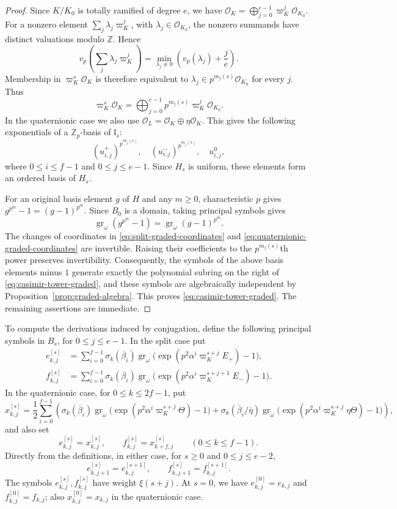 \documentclass[11pt]{article}
\numberwithin{equation}{section}
\theoremstyle{definition}
\theoremstyle{remark}
\newcommand{\Z}{\mathbb Z}
\newcommand{\cO}{\mathcal O}
\DeclareMathOperator{\gr}{gr}
\begin{document}
\begin{proof}
Since $K/K_0$ is totally ramified of degree $e$, we have
$\cO_K=\bigoplus_{j=0}^{e-1}\varpi_K^j\cO_{K_0}$.
For a nonzero element $\sum_j\lambda_j\varpi_K^j$, with
$\lambda_j\in\cO_{K_0}$, the nonzero summands have distinct
valuations modulo $\Z$. Hence
\[
 v_p\!\left(\sum_j\lambda_j\varpi_K^j\right)
   =\min_{\lambda_j\ne0}\left(v_p(\lambda_j)+\frac je\right).
\]
Membership in $\varpi_K^s\cO_K$ is therefore equivalent to
$\lambda_j\in p^{m_j(s)}\cO_{K_0}$ for every $j$. Thus
\[
 \varpi_K^s\cO_K
   =\bigoplus_{j=0}^{e-1}p^{m_j(s)}\varpi_K^j\cO_{K_0}.
\]
In the quaternionic case we also use
$\cO_L=\cO_K\oplus\eta\cO_K$. This gives the following exponentials
of a $\Z_p$-basis of $\mathfrak l_s$:
\[
 (u^+_{i,j})^{p^{m_j(s)}},\quad
 (u^-_{i,j})^{p^{m_j(s)}},\quad u^0_{i,j},
\]
where $0\leq i\leq f-1$ and $0\leq j\leq e-1$.
Since $H_s$ is uniform, these elements form an ordered basis of $H_s$.

For an original basis element $g$ of $H$ and any $m\geq0$,
characteristic $p$ gives $g^{p^m}-1=(g-1)^{p^m}$. Since $B_0$ is
a domain, taking principal symbols gives
\[
 \gr_\omega(g^{p^m}-1)=\gr_\omega(g-1)^{p^m}.
\]
The changes of coordinates in
\eqref{eq:split-graded-coordinates} and
\eqref{eq:quaternionic-graded-coordinates} are invertible.
Raising their coefficients to the $p^{m_j(s)}$th power preserves
invertibility.
Consequently, the symbols of the above basis elements minus $1$
generate exactly the polynomial subring on the right of
\eqref{eq:casimir-tower-graded}, and these symbols are algebraically
independent by Proposition~\ref{prop:graded-algebra}.
This proves \eqref{eq:casimir-tower-graded}.
The remaining assertions are immediate.
\end{proof}

To compute the derivations induced by conjugation, define the
following principal symbols in $B_s$, for $0\leq j\leq e-1$.
In the split case put
\[
 \begin{aligned}
 e_{k,j}^{[s]}&=\sum_{i=0}^{f-1}\sigma_k(\overline\beta_i)
    \gr_\omega\bigl(\exp(p^2\alpha^i\varpi_K^{s+j}E_+)-1\bigr),\\
 f_{k,j}^{[s]}&=\sum_{i=0}^{f-1}\sigma_k(\overline\beta_i)
    \gr_\omega\bigl(\exp(p^2\alpha^i\varpi_K^{s+j+1}E_-)-1\bigr).
 \end{aligned}
\]
In the quaternionic case, for $0\leq k\leq 2f-1$, put
\[
 x_{k,j}^{[s]}=\frac12\sum_{i=0}^{f-1}\left(
 \sigma_k(\overline\beta_i)
    \gr_\omega\bigl(\exp(p^2\alpha^i\varpi_K^{s+j}\Theta)-1\bigr)
 +\sigma_k(\overline\beta_i/\overline\eta)
    \gr_\omega\bigl(\exp(p^2\alpha^i\varpi_K^{s+j}\eta\Theta)-1\bigr)
 \right),
\]
and also set
\[
 e_{k,j}^{[s]}=x_{k,j}^{[s]},\qquad
 f_{k,j}^{[s]}=x_{k+f,j}^{[s]}
 \qquad(0\leq k\leq f-1).
\]
Directly from the definitions, in either case, for $s\geq0$ and
$0\leq j\leq e-2$,
\[
 e_{k,j+1}^{[s]}=e_{k,j}^{[s+1]},\qquad
 f_{k,j+1}^{[s]}=f_{k,j}^{[s+1]}.
\]
The symbols $e_{k,j}^{[s]},f_{k,j}^{[s]}$ have weight $\xi(s+j)$.
At $s=0$, we have $e_{k,j}^{[0]}=e_{k,j}$ and $f_{k,j}^{[0]}=f_{k,j}$;
also $x_{k,j}^{[0]}=x_{k,j}$ in the quaternionic case.
\end{document}
